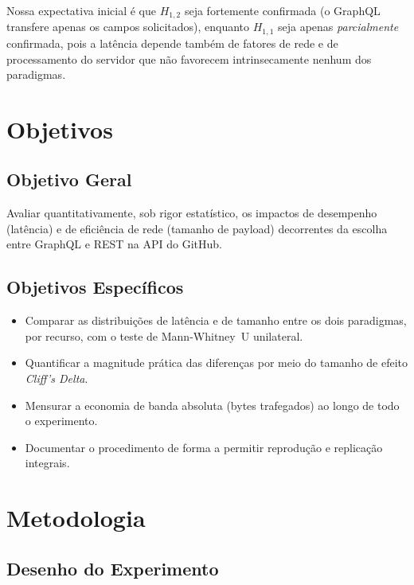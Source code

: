 \documentclass[10pt,a4paper,twocolumn]{article}
\begin{document}
Nossa expectativa inicial é que $H_{1,2}$ seja fortemente confirmada (o
GraphQL transfere apenas os campos solicitados), enquanto $H_{1,1}$ seja
apenas \emph{parcialmente} confirmada, pois a latência depende também de
fatores de rede e de processamento do servidor que não favorecem
intrinsecamente nenhum dos paradigmas.

\section{Objetivos}

\subsection{Objetivo Geral}

Avaliar quantitativamente, sob rigor estatístico, os impactos de desempenho
(latência) e de eficiência de rede (tamanho de payload) decorrentes da escolha
entre GraphQL e REST na API do GitHub.

\subsection{Objetivos Específicos}

\begin{itemize}
  \item Comparar as distribuições de latência e de tamanho entre os dois
    paradigmas, por recurso, com o teste de Mann-Whitney~U unilateral.
  \item Quantificar a magnitude prática das diferenças por meio do tamanho de
    efeito \textit{Cliff's Delta}.
  \item Mensurar a economia de banda absoluta (bytes trafegados) ao longo de
    todo o experimento.
  \item Documentar o procedimento de forma a permitir reprodução e replicação
    integrais.
\end{itemize}

\section{Metodologia}

\subsection{Desenho do Experimento}
\end{document}
